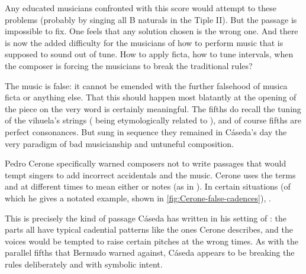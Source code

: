 Any educated musicians confronted with this score would attempt to  these problems (probably by singing all B naturals in the Tiple II).
But the passage is impossible to fix.
One feels that any solution chosen is the wrong one.
And there is now the added difficulty for the musicians of how to perform music that is supposed to sound out of tune.
How to apply ficta, how to tune intervals, when the composer is forcing the musicians to break the traditional rules?

The music is false: it cannot be emended with the further falsehood of musica ficta or anything else.
That this should happen most blatantly at the opening of the piece on the very word  is certainly meaningful.
The fifths do recall the tuning of the vihuela's strings ( being etymologically related to ), and of course fifths are perfect consonances.
But sung in sequence they remained in Cáseda's day the very paradigm of bad musicianship and untuneful composition.

Pedro Cerone specifically warned composers not to write passages that would tempt singers to add incorrect accidentals and  the music.
Cerone uses the terms  and  at different times to mean either  or  notes (as in ).
In certain situations (of which he gives a notated example, shown in \cref{fig:Cerone-false-cadences}), .%
	\autocite[629]{Cerone:Melopeo}


This is precisely the kind of passage Cáseda has written in his setting of : the parts all have typical cadential patterns like the ones Cerone describes, and the voices would be tempted to raise certain pitches at the wrong times. 
As with the parallel fifths that Bermudo warned against, Cáseda appears to be breaking the rules deliberately and with symbolic intent.


